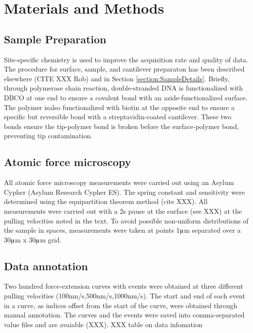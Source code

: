 \documentclass[%
  aip,12pt,tightenlines,
  amsthm,
 amsmath,amssymb
]{article}
\newcommand{\sRef}[1]{Section \ref{section:#1}}
\newcommand{\sLabel}[1]{\label{section:#1}}
\newcommand{\supply}[2]{(#1 #2)}
\begin{document}
\section{\sLabel{Materials}Materials and Methods}

\subsection{Sample Preparation}

Site-specific chemistry is used to improve the acquisition rate and quality of data. The procedure for surface, sample, and cantilever preparaton has been described elsewhere (CITE XXX Rob) and in \sRef{SampleDetails}. Briefly, through polymerase chain reaction, double-stranded DNA is functionalized with DBCO at one end to ensure a covalent bond with an azide-functionalized surface. The polymer isalso functionalized with biotin at the opposite end to ensure a specific but reversible bond with a streptavidin-coated cantilever. These two bonds ensure the tip-polymer bond is broken before the surface-polymer bond, preventing tip contamination.

\subsection{\sLabel{Surface}Atomic force microscopy}

All atomic force microscopy measurements were carried out using an Asylum Cypher \supply{Asylum Research}{Cypher ES}. The spring constant and sensitivity were determined using the equipartition theorem method (cite XXX). All measurements were carried out with a 2s pause at the surface (see XXX) at the pulling velocities noted in the text. To avoid possible non-uniform distributions of the sample in spaces, measurements were taken at points 1$\muup$m separated over a 30$\muup$m x 30$\muup$m grid. 

\subsection{\sLabel{Annotation}Data annotation}

Two hundred force-extension curves with events were obtained at three different pulling velocities (100nm/s,500nm/s,1000nm/s). The start and end of each event in a curve, as indices offset from the start of the curve, were obtained through manual annotation. The curves and the events were saved into comma-separated value files and are avaiable (XXX). XXX table on data infomation
\end{document}
